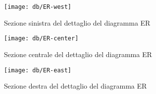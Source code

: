 \begin{figure}[b]
	\texttt{[image: db/ER-west]}
	\caption{Sezione sinistra del dettaglio del diagramma ER}
	\label{fig:er-west}
\end{figure}

\begin{figure}[b]
	\texttt{[image: db/ER-center]}
	\caption{Sezione centrale del dettaglio del diagramma ER}
	\label{fig:er-center}
\end{figure}

\begin{figure}[b]
	\texttt{[image: db/ER-east]}
	\caption{Sezione destra del dettaglio del diagramma ER}
	\label{fig:er-east}
\end{figure}
